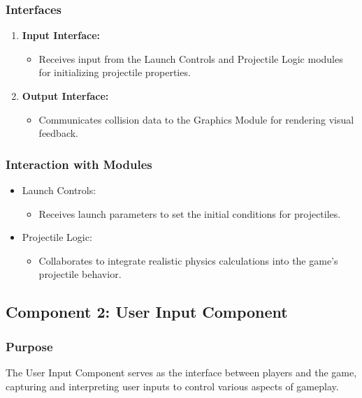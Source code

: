 \documentclass[12pt, titlepage]{article}
\begin{document}
\subsubsection{Interfaces}
    \begin{enumerate}
        \item \textbf{Input Interface:}
            \begin{itemize}
                \item Receives input from the Launch Controls and Projectile Logic modules for initializing projectile properties.
            \end{itemize}
        \item \textbf{Output Interface:}
            \begin{itemize}
                \item Communicates collision data to the Graphics Module for rendering visual feedback.
            \end{itemize}
    \end{enumerate}

\subsubsection{Interaction with Modules}
\begin{itemize}
    \item Launch Controls:
        \begin{itemize}
            \item Receives launch parameters to set the initial conditions for projectiles.
        \end{itemize}
    \item Projectile Logic:
        \begin{itemize}
            \item Collaborates to integrate realistic physics calculations into the game's projectile behavior.
        \end{itemize}
\end{itemize}

\subsection{Component 2: User Input Component}
\subsubsection{Purpose}
The User Input Component serves as the interface between players and the game, capturing and interpreting user inputs to control various aspects of gameplay.
\end{document}
